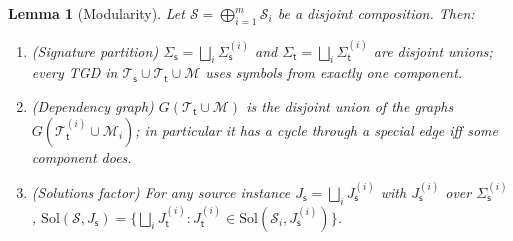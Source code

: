 \documentclass{amsart}
\newtheorem{lemma}{Lemma}
\theoremstyle{definition}
\newcommand{\Tbox}{\mathcal{T}}
\newcommand{\Sig}{\Sigma}
\newcommand{\Map}{\mathcal{M}}
\newcommand{\src}{\mathsf{s}}
\newcommand{\trg}{\mathsf{t}}
\newcommand{\Scn}{\mathcal{S}}
\begin{document}
\begin{lemma}[Modularity]\label{lem:modularity}
Let $\Scn=\bigoplus_{i=1}^m\Scn_i$ be a disjoint composition. Then:
\begin{enumerate}[label=(\alph*),nosep]
\item (Signature partition) $\Sig_\src=\bigsqcup_i\Sig_\src^{(i)}$ and
$\Sig_\trg=\bigsqcup_i\Sig_\trg^{(i)}$ are disjoint unions; every TGD in
$\Tbox_\src\cup\Tbox_\trg\cup\Map$ uses symbols from exactly one component.
\item (Dependency graph) $G(\Tbox_\trg\cup\Map)$ is the disjoint union of the
graphs $G(\Tbox_\trg^{(i)}\cup\Map_i)$; in particular it has a cycle through a
special edge iff some component does.
\item (Solutions factor) For any source instance
$J_\src=\bigsqcup_i J_\src^{(i)}$ with $J_\src^{(i)}$ over $\Sig_\src^{(i)}$,
$\mathrm{Sol}(\Scn,J_\src)=\{\bigsqcup_i J_\trg^{(i)} :
J_\trg^{(i)}\in\mathrm{Sol}(\Scn_i,J_\src^{(i)})\}$.
\end{enumerate}
\end{lemma}
\end{document}
